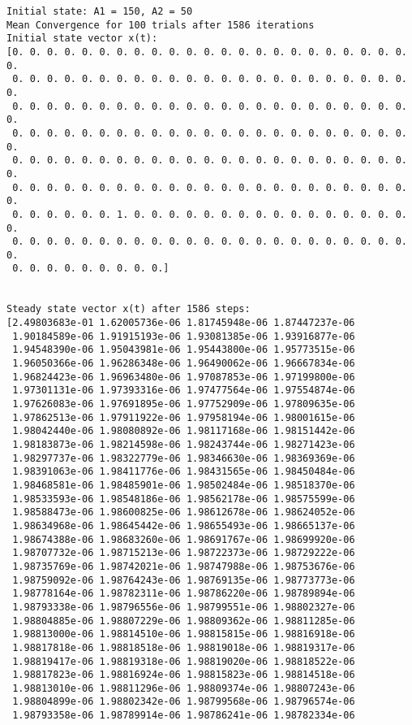 \documentclass[11pt]{article}
\begin{document}
\begin{Verbatim}[commandchars=\\\{\}]
Initial state: A1 = 150, A2 = 50
Mean Convergence for 100 trials after 1586 iterations
Initial state vector x(t):
[0. 0. 0. 0. 0. 0. 0. 0. 0. 0. 0. 0. 0. 0. 0. 0. 0. 0. 0. 0. 0. 0. 0. 0.
 0. 0. 0. 0. 0. 0. 0. 0. 0. 0. 0. 0. 0. 0. 0. 0. 0. 0. 0. 0. 0. 0. 0. 0.
 0. 0. 0. 0. 0. 0. 0. 0. 0. 0. 0. 0. 0. 0. 0. 0. 0. 0. 0. 0. 0. 0. 0. 0.
 0. 0. 0. 0. 0. 0. 0. 0. 0. 0. 0. 0. 0. 0. 0. 0. 0. 0. 0. 0. 0. 0. 0. 0.
 0. 0. 0. 0. 0. 0. 0. 0. 0. 0. 0. 0. 0. 0. 0. 0. 0. 0. 0. 0. 0. 0. 0. 0.
 0. 0. 0. 0. 0. 0. 0. 0. 0. 0. 0. 0. 0. 0. 0. 0. 0. 0. 0. 0. 0. 0. 0. 0.
 0. 0. 0. 0. 0. 0. 1. 0. 0. 0. 0. 0. 0. 0. 0. 0. 0. 0. 0. 0. 0. 0. 0. 0.
 0. 0. 0. 0. 0. 0. 0. 0. 0. 0. 0. 0. 0. 0. 0. 0. 0. 0. 0. 0. 0. 0. 0. 0.
 0. 0. 0. 0. 0. 0. 0. 0. 0.]


Steady state vector x(t) after 1586 steps:
[2.49803683e-01 1.62005736e-06 1.81745948e-06 1.87447237e-06
 1.90184589e-06 1.91915193e-06 1.93081385e-06 1.93916877e-06
 1.94548390e-06 1.95043981e-06 1.95443800e-06 1.95773515e-06
 1.96050366e-06 1.96286348e-06 1.96490062e-06 1.96667834e-06
 1.96824423e-06 1.96963480e-06 1.97087853e-06 1.97199800e-06
 1.97301131e-06 1.97393316e-06 1.97477564e-06 1.97554874e-06
 1.97626083e-06 1.97691895e-06 1.97752909e-06 1.97809635e-06
 1.97862513e-06 1.97911922e-06 1.97958194e-06 1.98001615e-06
 1.98042440e-06 1.98080892e-06 1.98117168e-06 1.98151442e-06
 1.98183873e-06 1.98214598e-06 1.98243744e-06 1.98271423e-06
 1.98297737e-06 1.98322779e-06 1.98346630e-06 1.98369369e-06
 1.98391063e-06 1.98411776e-06 1.98431565e-06 1.98450484e-06
 1.98468581e-06 1.98485901e-06 1.98502484e-06 1.98518370e-06
 1.98533593e-06 1.98548186e-06 1.98562178e-06 1.98575599e-06
 1.98588473e-06 1.98600825e-06 1.98612678e-06 1.98624052e-06
 1.98634968e-06 1.98645442e-06 1.98655493e-06 1.98665137e-06
 1.98674388e-06 1.98683260e-06 1.98691767e-06 1.98699920e-06
 1.98707732e-06 1.98715213e-06 1.98722373e-06 1.98729222e-06
 1.98735769e-06 1.98742021e-06 1.98747988e-06 1.98753676e-06
 1.98759092e-06 1.98764243e-06 1.98769135e-06 1.98773773e-06
 1.98778164e-06 1.98782311e-06 1.98786220e-06 1.98789894e-06
 1.98793338e-06 1.98796556e-06 1.98799551e-06 1.98802327e-06
 1.98804885e-06 1.98807229e-06 1.98809362e-06 1.98811285e-06
 1.98813000e-06 1.98814510e-06 1.98815815e-06 1.98816918e-06
 1.98817818e-06 1.98818518e-06 1.98819018e-06 1.98819317e-06
 1.98819417e-06 1.98819318e-06 1.98819020e-06 1.98818522e-06
 1.98817823e-06 1.98816924e-06 1.98815823e-06 1.98814518e-06
 1.98813010e-06 1.98811296e-06 1.98809374e-06 1.98807243e-06
 1.98804899e-06 1.98802342e-06 1.98799568e-06 1.98796574e-06
 1.98793358e-06 1.98789914e-06 1.98786241e-06 1.98782334e-06

\end{Verbatim}
\end{document}
